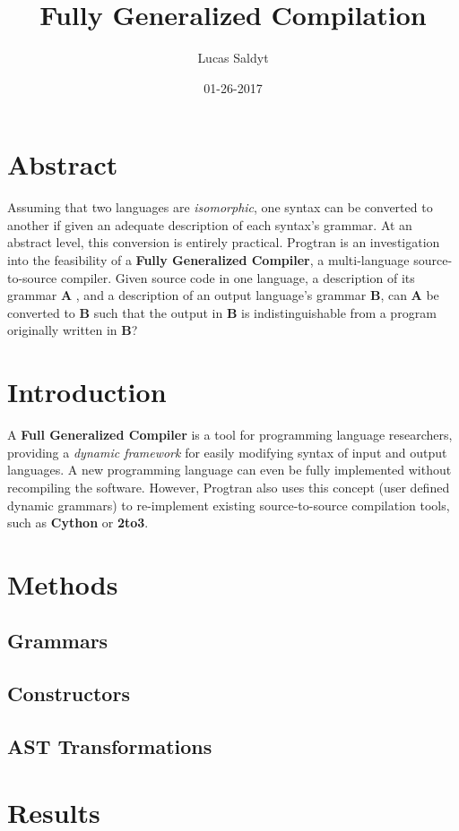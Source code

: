 \documentclass{article}
\title{Fully Generalized Compilation}
\date{01-26-2017}
\author{Lucas Saldyt}
\begin{document}
\maketitle
{}
\newpage
{}

\section{Abstract}

Assuming that two languages are \textit{isomorphic}, one syntax can be converted to another if given an adequate description of each syntax's grammar. At an abstract level, this conversion is entirely practical. Progtran is an investigation into the feasibility of a \textbf{Fully Generalized Compiler}, a multi-language source-to-source compiler. Given source code in one language, a description of its grammar \textbf{A} , and a description of an output language's grammar \textbf{B}, can \textbf{A} be converted to \textbf{B} such that the output in \textbf{B} is indistinguishable from a program originally written in \textbf{B}?

\section{Introduction}

A \textbf{Full Generalized Compiler} is a tool for programming language researchers, providing a \textit{dynamic framework} for easily modifying syntax of input and output languages. A new programming language can even be fully implemented without recompiling the software. However, Progtran also uses this concept (user defined dynamic grammars) to re-implement existing source-to-source compilation tools, such as \textbf{Cython} or \textbf{2to3}.

\section{Methods}
\subsection{Grammars}
\subsection{Constructors}
\subsection{AST Transformations}


\section{Results}
\end{document}
